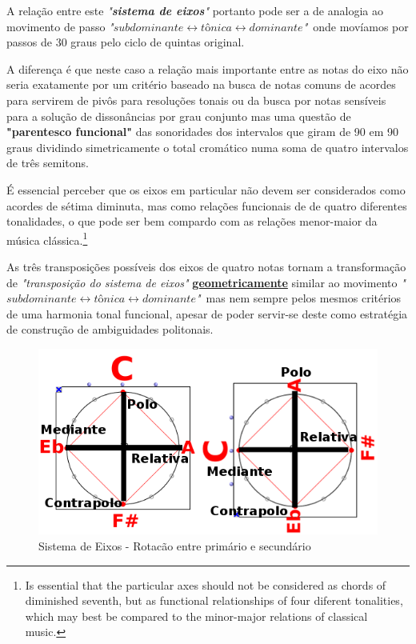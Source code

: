 \documentclass[
	12pt,				%
	openright,			%
	twoside,			%
	a4paper,			%
	english,			%
	french,				%
	spanish,			%
	brazil				%
	]{abntex2}
\begin{document}
A relação entre este \textit{"\textbf{sistema de eixos}"} portanto pode ser a de analogia ao movimento de passo \textit{"$subdominante \leftrightarrow tônica \leftrightarrow dominante$"}\ onde movíamos por passos de 30 graus pelo ciclo de quintas original.  

A diferença é que neste caso a relação mais importante entre as notas do eixo não seria exatamente por um critério baseado na busca de notas comuns de acordes para servirem de pivôs para resoluções tonais ou da busca por notas sensíveis para a solução de dissonâncias por grau conjunto mas uma questão de \textbf{"\textbf{parentesco funcional}"} das sonoridades dos intervalos que giram de 90 em 90 graus dividindo simetricamente o total cromático numa soma de quatro intervalos de três semitons.

\begin{citacao}
É essencial perceber que os eixos em particular não devem ser considerados como acordes de sétima diminuta, mas como relações funcionais de de quatro diferentes tonalidades, o que pode ser bem compardo com as relações menor-maior da música clássica.\cite[ p.3]{lendvai1971bela}\footnote{
Is essential that the particular axes should not be considered as chords of diminished seventh, but as functional relationships of four diferent tonalities, which may best be compared to the minor-major relations of classical music.\cite[ p.3]{lendvai1971bela}}
\end{citacao}

As três transposições possíveis dos eixos de quatro notas tornam a transformação de \textit{"transposição do sistema de eixos"} \textbf{\textbf{\underline{geometricamente}}} similar ao movimento \textit{"$subdominante \leftrightarrow tônica \leftrightarrow dominante$"}\ mas nem sempre pelos mesmos critérios de uma harmonia tonal funcional, apesar de poder servir-se deste como estratégia de construção de ambiguidades politonais.

\begin{figure}[!h]
	\caption{\label{fig_grafico}Sistema de Eixos - Rotacão entre primário e secundário}
	\begin{center}
	    \includegraphics[scale=0.4]{axis/PoloContrapolo.png}
	\end{center}
\end{figure}
\end{document}
